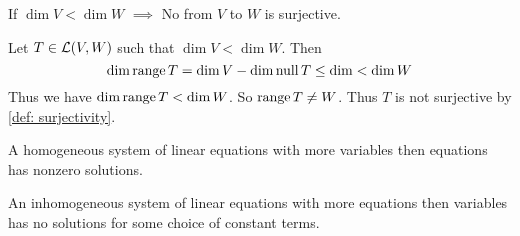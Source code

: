   \setcounter{thm}{23}
  \begin{thm} 
    If $\dim V < \dim W$ $\implies$ No \lm from $V$ to $W$ is surjective.
  \end{thm}
  \begin{prf}
    Let $T\in \mathcal{L} (V,W)$ such that $\dim V < \dim W$. Then
    \begin{equation}
      \dim \operatorname{range} T = \dim V - \dim \operatorname{null} T \leq \dim < \dim W
    \end{equation}
    Thus we have $\dim \operatorname{range} T < \dim W$. So $\operatorname{range} T \neq W$. Thus $T$ is not surjective by \ref{def: surjectivity}.
  \end{prf}

  \setcounter{thm}{25}
  \begin{thm} 
    A homogeneous system of linear equations with more variables then equations has nonzero solutions.
  \end{thm}

  \setcounter{thm}{27}
  \begin{thm} 
    An inhomogeneous system of linear equations with more equations then variables has no solutions for some choice of constant terms.
  \end{thm}
